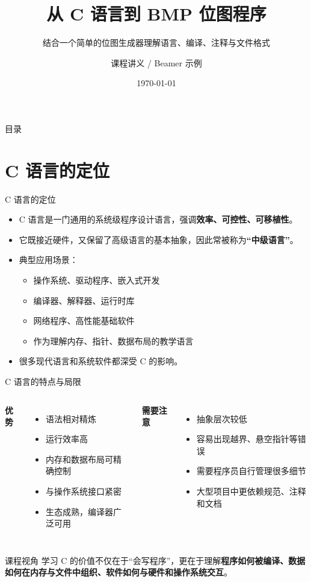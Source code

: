 \documentclass[aspectratio=169,11pt]{beamer}
\title{从 C 语言到 BMP 位图程序}
\subtitle{结合一个简单的位图生成器理解语言、编译、注释与文件格式}
\author{课程讲义 / Beamer 示例}
\date{\today}
\begin{document}
\begin{frame}
  \titlepage
\end{frame}

\begin{frame}{目录}
  \tableofcontents
\end{frame}

\section{C 语言的定位}

\begin{frame}{C 语言的定位}
\begin{itemize}
  \item C 语言是一门\alert{通用的系统级程序设计语言}，强调\textbf{效率、可控性、可移植性}。
  \item 它既接近硬件，又保留了高级语言的基本抽象，因此常被称为\textbf{“中级语言”}。
  \item 典型应用场景：
  \begin{itemize}
    \item 操作系统、驱动程序、嵌入式开发
    \item 编译器、解释器、运行时库
    \item 网络程序、高性能基础软件
    \item 作为理解内存、指针、数据布局的教学语言
  \end{itemize}
  \item 很多现代语言和系统软件都深受 C 的影响。
\end{itemize}
\end{frame}

\begin{frame}{C 语言的特点与局限}
\begin{columns}[T]
\textbf{优势}
\begin{itemize}
  \item 语法相对精炼
  \item 运行效率高
  \item 内存和数据布局可精确控制
  \item 与操作系统接口紧密
  \item 生态成熟，编译器广泛可用
\end{itemize}

\textbf{需要注意}
\begin{itemize}
  \item 抽象层次较低
  \item 容易出现越界、悬空指针等错误
  \item 需要程序员自行管理很多细节
  \item 大型项目中更依赖规范、注释和文档
\end{itemize}
\end{columns}

\vspace{0.4em}
\begin{block}{课程视角}
学习 C 的价值不仅在于“会写程序”，更在于理解\textbf{程序如何被编译、数据如何在内存与文件中组织、软件如何与硬件和操作系统交互}。
\end{block}
\end{frame}
\end{document}
